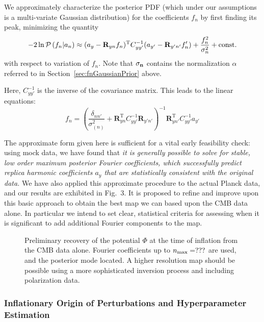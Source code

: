 \documentclass[psfig,11pt]{article}
\begin{document}
We approximately characterize the posterior PDF (which under our assumptions is a multi-variate Gaussian distribution) for the coefficients $f_n$ by first finding its peak, minimizing the quantity
\begin{equation}
-2\ln{\cal P}\left(f_n|a_n\right) \approx (a_y- \mathbf{R}_{yn}f_n)^{\mathrm{T}}C_{yy'}^{-1}(a_{y'}-\mathbf{R}_{y'n'}f_n')+\frac{f_n^2}{\sigma_{ n}^2} + \mathrm{const.}
\end{equation}
with respect to variation of $f_n$. Note that $\sigma_{\bf n}$ contains the normalization $\alpha$ referred to in Section~\ref{sec:fnGaussianPrior} above.

Here, $C_{yy'}^{-1}$ is the inverse
of the covariance matrix. This leads to the linear equations:
\begin{equation}
f_n=\left(\frac{\delta_{nn'}}{\sigma_{(n)}^2}+\mathbf{R}_{yn}^{\mathrm{T}}C_{yy'}^{-1}\mathbf{R}_{y'n'}\right)^{-1}\mathbf{R}^{\mathrm{T}}_{yn'}C_{yy'}^{-1}a_{y'}
\end{equation}

The approximate form given here is sufficient for a vital early feasibility check:
using mock data, we have found that {\it it is generally possible to solve for stable, low order maximum posterior Fourier coefficients, which successfully predict replica harmonic coefficients $a_y$ that are statistically consistent with the original data.} We have also applied this approximate procedure to the actual Planck data, and our results are exhibited in Fig.~3. It is proposed to refine and improve upon this basic approach to obtain the best map we can based upon the CMB data alone. In particular we intend to set clear, statistical criteria for assessing when it is significant to add additional Fourier components to the map.
\begin{figure}[t]
\centering
\caption{Preliminary recovery of the potential $\Phi$ at the time of inflation from the CMB data alone. Fourier coefficients up to $n_{\rm max}=???$ are used, and the posterior mode located. A higher resolution map should be possible using a more sophisticated inversion process and including polarization data.}
\end{figure}


\subsubsection{Inflationary Origin of Perturbations and Hyperparameter Estimation}
\end{document}
